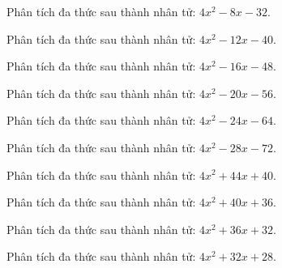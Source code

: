 \begin{bt}
	Phân tích đa thức sau thành nhân tử: $4 x^2 - 8 x - 32$.
\end{bt}
\begin{bt}
	Phân tích đa thức sau thành nhân tử: $4 x^2 - 12 x - 40$.
\end{bt}
\begin{bt}
	Phân tích đa thức sau thành nhân tử: $4 x^2 - 16 x - 48$.
\end{bt}
\begin{bt}
	Phân tích đa thức sau thành nhân tử: $4 x^2 - 20 x - 56$.
\end{bt}
\begin{bt}
	Phân tích đa thức sau thành nhân tử: $4 x^2 - 24 x - 64$.
\end{bt}
\begin{bt}
	Phân tích đa thức sau thành nhân tử: $4 x^2 - 28 x - 72$.
\end{bt}
\begin{bt}
	Phân tích đa thức sau thành nhân tử: $4 x^2 + 44 x + 40$.
\end{bt}
\begin{bt}
	Phân tích đa thức sau thành nhân tử: $4 x^2 + 40 x + 36$.
\end{bt}
\begin{bt}
	Phân tích đa thức sau thành nhân tử: $4 x^2 + 36 x + 32$.
\end{bt}
\begin{bt}
	Phân tích đa thức sau thành nhân tử: $4 x^2 + 32 x + 28$.
\end{bt}
